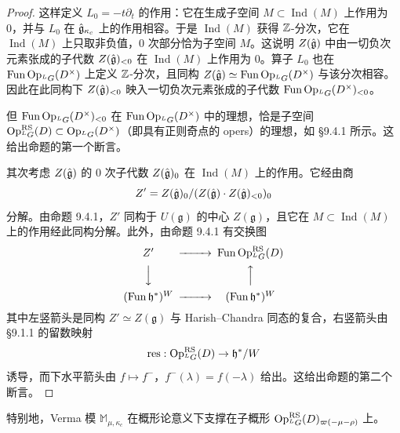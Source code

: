 \begin{proof}
    这样定义 $L_0=-t\partial_t$ 的作用：它在生成子空间 $M\subset\operatorname{Ind}(M)$ 上作用为 0，并与 $L_0$ 在 $\hat{\mathfrak{g}}_{\kappa_c}$ 上的作用相容。于是 $\operatorname{Ind}(M)$ 获得 $\mathbb{Z}$-分次，它在 $\operatorname{Ind}(M)$ 上只取非负值，0 次部分恰为子空间 $M$。这说明 $Z(\hat{\mathfrak{g}})$ 中由一切负次元素张成的子代数 $Z(\hat{\mathfrak{g}})_{<0}$ 在 $\operatorname{Ind}(M)$ 上作用为 0。算子 $L_0$ 也在 $\operatorname{Fun}\operatorname{Op}_{{}^LG}(D^\times)$ 上定义 $\mathbb{Z}$-分次，且同构 $Z(\hat{\mathfrak{g}})\simeq\operatorname{Fun}\operatorname{Op}_{{}^LG}(D^\times)$ 与该分次相容。因此在此同构下 $Z(\hat{\mathfrak{g}})_{<0}$ 映入一切负次元素张成的子代数 $\operatorname{Fun}\operatorname{Op}_{{}^LG}(D^\times)_{<0}$。

    但 $\operatorname{Fun}\operatorname{Op}_{{}^LG}(D^\times)_{<0}$ 在 $\operatorname{Fun}\operatorname{Op}_{{}^LG}(D^\times)$ 中的理想，恰是子空间 $\operatorname{Op}^{\mathrm{RS}}_{{}^LG}(D)\subset\operatorname{Op}_{{}^LG}(D^\times)$（即具有正则奇点的 opers）的理想，如 §9.4.1 所示。这给出命题的第一个断言。

    其次考虑 $Z(\hat{\mathfrak{g}})$ 的 0 次子代数 $Z(\hat{\mathfrak{g}})_0$ 在 $\operatorname{Ind}(M)$ 上的作用。它经由商
    \[
        Z'=Z(\hat{\mathfrak{g}})_0/(Z(\hat{\mathfrak{g}})\cdot Z(\hat{\mathfrak{g}})_{<0})_0
    \]
    分解。由命题 9.4.1，$Z'$ 同构于 $U(\mathfrak{g})$ 的中心 $Z(\mathfrak{g})$，且它在 $M\subset\operatorname{Ind}(M)$ 上的作用经此同构分解。此外，由命题 9.4.1 有交换图
    \[
        \begin{CD}
            Z' @>>> \operatorname{Fun}\Op^{\mathrm{RS}}_{{}^LG}(D)\\
            @VVV @AAA\\
            (\operatorname{Fun}\mathfrak{h}^*)^W @>>> (\operatorname{Fun}\mathfrak{h}^*)^W
        \end{CD}
    \]
    其中左竖箭头是同构 $Z'\simeq Z(\mathfrak{g})$ 与 Harish--Chandra 同态的复合，右竖箭头由 §9.1.1 的留数映射
    \[
        \operatorname{res}:\operatorname{Op}^{\mathrm{RS}}_{{}^LG}(D)\to\mathfrak{h}^*/W
    \]
    诱导，而下水平箭头由 $f\mapsto f^-$，$f^-(\lambda)=f(-\lambda)$ 给出。这给出命题的第二个断言。
\end{proof}

特别地，Verma 模 $\mathbb{M}_{\mu,\kappa_c}$ 在概形论意义下支撑在子概形 $\operatorname{Op}^{\mathrm{RS}}_{{}^LG}(D)_{\varpi(-\mu-\rho)}$ 上。


